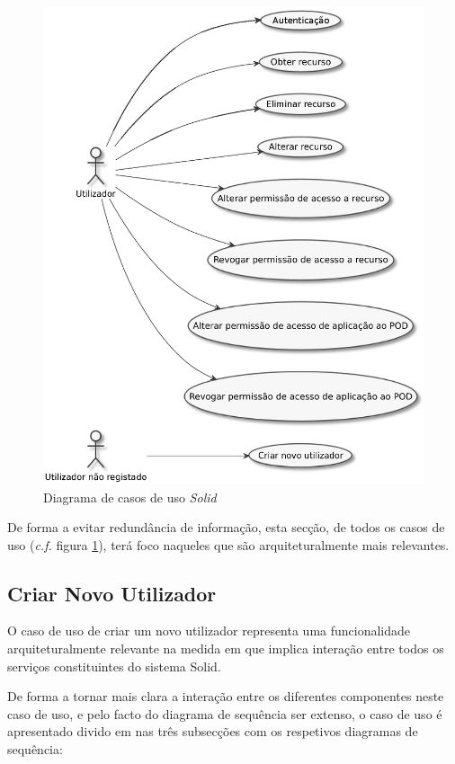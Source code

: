\begin{figure}[H]
    \begin{center}
    \includegraphics[height=1 \textwidth]{figures/uc_diagram.eps}
    \caption{Diagrama de casos de uso
    \emph{Solid}}
    \label{uc_diagram}
    \end{center}
\end{figure}

De forma a evitar redundância de informação, esta secção, de todos os casos de uso (\emph{c.f.} figura \ref{uc_diagram}), terá foco naqueles que são arquiteturalmente mais relevantes.

\subsection{Criar Novo Utilizador \label{create_user_use_case_design}}

O caso de uso de criar um novo utilizador representa uma funcionalidade arquiteturalmente relevante na medida em que implica interação entre todos os serviços constituintes do sistema Solid.

De forma a tornar mais clara a interação entre os diferentes componentes neste caso de uso, e pelo facto do diagrama de sequência ser extenso, o caso de uso é apresentado divido em nas três subsecções com os respetivos diagramas de sequência:

